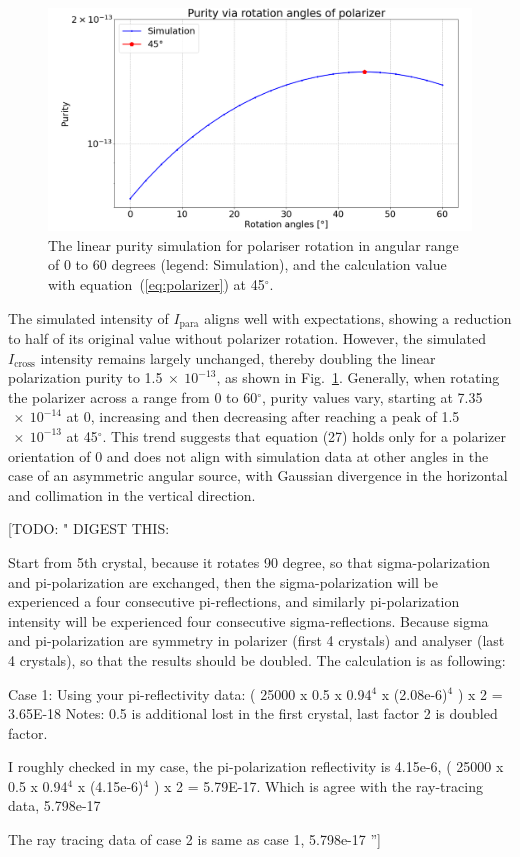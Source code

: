\documentclass{iucr}
\newcommand{\todo}[1]{{\color{red}[TODO: "#1'']}}
\begin{document}
\begin{figure}\label{fig:polarizer}
\centering
\includegraphics[width=0.95\linewidth]{figures/polarizer.png}
\caption{The linear purity simulation for polariser rotation in angular range of 0 to 60 degrees (legend: Simulation), and the calculation value with equation~(\ref{eq:polarizer}) at 45$^\circ$.}
\end{figure}

The simulated intensity of  $I_\text{para}$ aligns well with expectations, showing a reduction to half of its original value without polarizer rotation.
However, the simulated $I_\text{cross}$ intensity remains largely unchanged, thereby doubling the linear polarization purity to 1.5$~\times~10^{-13}$, as shown in Fig.~\ref{fig:polarizer}.
Generally, when rotating the polarizer across a range from 0 to 60$^\circ$, purity values vary, starting at 7.35$~\times~10^{-14}$ at 0, increasing and then decreasing after reaching a peak of 1.5$~\times~10^{-13}$ at 45$^\circ$.
This trend suggests that equation (27) holds only for a polarizer orientation of 0 and does not align with simulation data at other angles in the case of an asymmetric angular source, with Gaussian divergence in the horizontal and collimation in the vertical direction.


\todo{
DIGEST THIS: 

Start from 5th crystal, because it rotates 90 degree, so that sigma-polarization and pi-polarization are exchanged, then the sigma-polarization will be experienced a four consecutive pi-reflections, and similarly pi-polarization intensity will be experienced four consecutive sigma-reflections. Because sigma and pi-polarization are symmetry in polarizer (first 4 crystals) and analyser (last 4 crystals), so that the results should be doubled. The calculation is as following:

Case 1: 
Using your pi-reflectivity data:
( 25000 x 0.5 x 0.94$^4$ x (2.08e-6)$^4$ ) x 2 = 3.65E-18
Notes: 0.5 is additional lost in the first crystal, last factor 2 is doubled factor.

I roughly checked in my case,  the pi-polarization reflectivity is 4.15e-6, 
( 25000 x 0.5 x 0.94$^4$ x (4.15e-6)$^4$ ) x 2 = 5.79E-17.
Which is  agree with the ray-tracing data, 5.798e-17

The ray tracing data of case 2 is same as case 1, 5.798e-17
}
\end{document}
